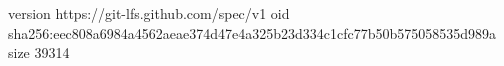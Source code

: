 version https://git-lfs.github.com/spec/v1
oid sha256:eec808a6984a4562aeae374d47e4a325b23d334c1cfc77b50b575058535d989a
size 39314
